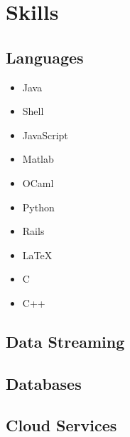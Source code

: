 \documentclass[letterpaper]{resume}
\begin{document}



\begin{minipage}[t]{0.33\textwidth} %


\section{Skills}

\subsection{Languages}
\begin{itemize}
\item Java
\item Shell
\item JavaScript
\item Matlab
\item OCaml
\item Python
\item Rails
\item \LaTeX\
\item C
\item C++
\end{itemize}

\sectionspace %

\subsection{Data Streaming}

\subsection{Databases}

\subsection{Cloud Services}


\end{minipage}
\end{document}
